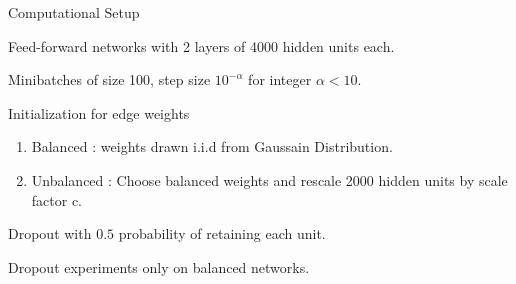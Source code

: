 \documentclass[presentation,xcolor={usenames,dvipsnames},10pt]{beamer}
\begin{document}
\begin{frame}{Computational Setup}

\bit 
\item Feed-forward networks with 2 layers of 4000 hidden units each. 
\item Minibatches of size 100, step size $10^{-\alpha}$ for integer $\alpha <10$.
\item Initialization for edge weights
\begin{enumerate}
	\item Balanced : weights drawn i.i.d from Gaussain Distribution. 
	\item Unbalanced : Choose balanced weights and rescale 2000 hidden units by scale factor c. 
\end{enumerate}  
\item Dropout with $0.5$ probability of retaining each unit. 
\item Dropout experiments only on balanced networks. 
\eit 

\end{frame}
\end{document}
